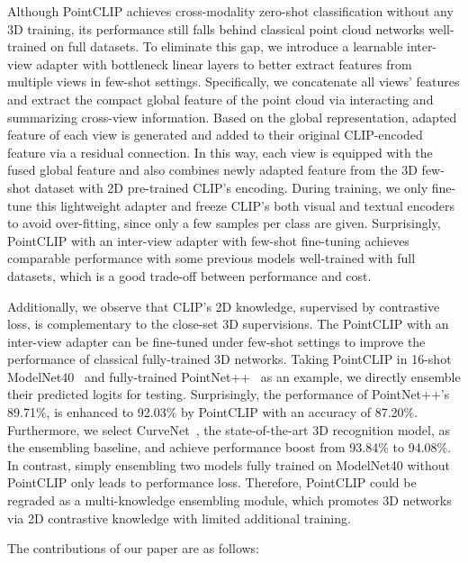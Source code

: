 \documentclass[10pt,twocolumn,letterpaper]{article}
\begin{document}
Although PointCLIP achieves cross-modality zero-shot classification without any 3D training, its performance still falls behind classical point cloud networks well-trained on full datasets. To eliminate this gap, we introduce a learnable inter-view adapter with bottleneck linear layers to better extract features from multiple views in few-shot settings. Specifically, we concatenate all views' features and extract the compact global feature of the point cloud via interacting and summarizing cross-view information. Based on the global representation, adapted feature of each view is generated and added to their original CLIP-encoded feature via a residual connection. In this way, each view is equipped with the fused global feature and also combines newly adapted feature from the 3D few-shot dataset with 2D pre-trained CLIP's encoding. During training, we only fine-tune this lightweight adapter and freeze CLIP's both visual and textual encoders to avoid over-fitting, since only a few samples per class are given. Surprisingly, PointCLIP with an inter-view adapter with few-shot fine-tuning achieves comparable performance with some previous models well-trained with full datasets, which is a good trade-off between performance and cost.

Additionally, we observe that CLIP's 2D knowledge, supervised by contrastive loss, is complementary to the close-set 3D supervisions. The PointCLIP with an inter-view adapter can be fine-tuned under few-shot settings to improve the performance of classical fully-trained 3D networks. Taking PointCLIP in 16-shot ModelNet40~\cite{wu20153d} and fully-trained PointNet++~\cite{qi2017pointnet++} as an example, we directly ensemble their predicted logits for testing. Surprisingly, the performance of PointNet++'s 89.71$\%$, is enhanced to 92.03$\%$ by PointCLIP with an accuracy of 87.20$\%$. Furthermore, we select CurveNet~\cite{muzahid2020curvenet}, the state-of-the-art 3D recognition model, as the ensembling baseline, and achieve performance boost from 93.84$\%$ to 94.08$\%$. 
In contrast, simply ensembling two models fully trained on ModelNet40 without PointCLIP only leads to performance loss. Therefore, PointCLIP could be regraded as a multi-knowledge ensembling module, which promotes 3D networks via 2D contrastive knowledge with limited additional training.

The contributions of our paper are as follows:
\end{document}
